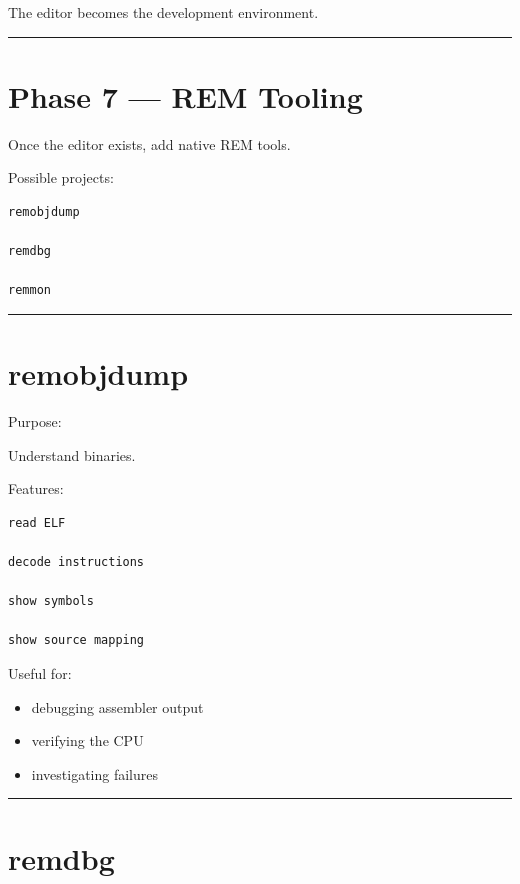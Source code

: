 \documentclass[
  oneside,
  openany]{book}
\providecommand{\tightlist}{%
  \setlength{\itemsep}{0pt}\setlength{\parskip}{0pt}}
\begin{document}
The editor becomes the development environment.

\begin{center}\rule{0.5\linewidth}{0.5pt}\end{center}

\hypertarget{phase-7-rem-tooling}{%
\section{Phase 7 --- REM Tooling}\label{phase-7-rem-tooling}}

Once the editor exists, add native REM tools.

Possible projects:

\begin{verbatim}
remobjdump

remdbg

remmon
\end{verbatim}

\begin{center}\rule{0.5\linewidth}{0.5pt}\end{center}

\hypertarget{remobjdump}{%
\section{remobjdump}\label{remobjdump}}

Purpose:

Understand binaries.

Features:

\begin{verbatim}
read ELF

decode instructions

show symbols

show source mapping
\end{verbatim}

Useful for:

\begin{itemize}
\tightlist
\item
  debugging assembler output
\item
  verifying the CPU
\item
  investigating failures
\end{itemize}

\begin{center}\rule{0.5\linewidth}{0.5pt}\end{center}

\hypertarget{remdbg}{%
\section{remdbg}\label{remdbg}}
\end{document}
